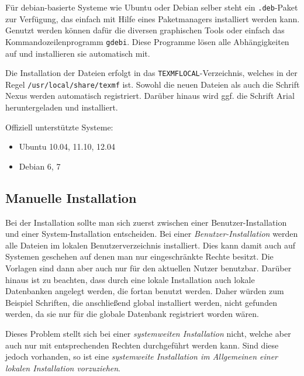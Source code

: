 Für debian-basierte Systeme wie Ubuntu oder Debian selber steht ein
\texttt{.deb}-Paket zur Verfügung, das einfach mit Hilfe eines Paketmanagers
installiert werden kann.
Genutzt werden können dafür die diversen graphischen Tools oder einfach das
Kommandozeilenprogramm \texttt{gdebi}. Diese Programme lösen alle Abhängigkeiten
auf und installieren sie automatisch mit.

Die Installation der Dateien erfolgt in das \texttt{TEXMFLOCAL}-Verzeichnis,
welches in der Regel \lstinline{/usr/local/share/texmf} ist.
Sowohl die neuen Dateien als auch die Schrift Nexus werden automatisch registriert.
Darüber hinaus wird ggf. die Schrift Arial heruntergeladen und installiert.

Offiziell unterstützte Systeme:
\begin{itemize}
  \item Ubuntu 10.04, 11.10, 12.04
  \item Debian 6, 7
\end{itemize}


\subsection{Manuelle Installation}

Bei der Installation sollte man sich zuerst zwischen einer Benutzer-Installation
und einer System-Installation entscheiden.
Bei einer \emph{Benutzer-Installation} werden alle Dateien im lokalen Benutzerverzeichnis installiert.
Dies kann damit auch auf Systemen geschehen auf denen man nur
eingeschränkte Rechte besitzt.
Die Vorlagen sind dann aber auch nur für den aktuellen Nutzer benutzbar.
Darüber hinaus ist zu beachten, dass durch eine lokale Installation auch
lokale Datenbanken angelegt werden, die fortan benutzt werden.
Daher würden zum Beispiel Schriften, die anschließend global installiert werden,
nicht gefunden werden, da sie nur für die globale Datenbank registriert worden wären.

Dieses Problem stellt sich bei einer \emph{systemweiten Installation} nicht,
welche aber auch nur mit entsprechenden Rechten durchgeführt werden kann.
Sind diese jedoch vorhanden, so ist eine \emph{systemweite Installation im
Allgemeinen einer lokalen Installation vorzuziehen}.

